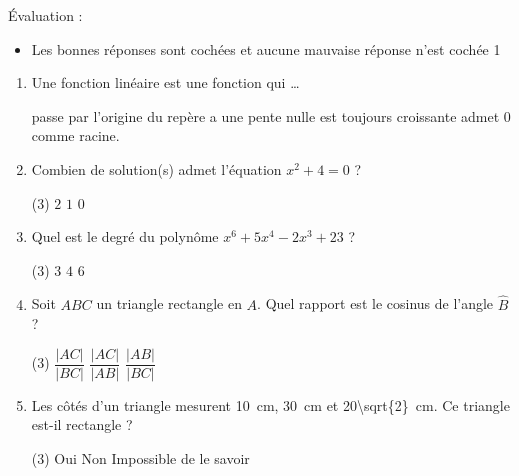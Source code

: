 %
%
    Évaluation :
    \begin{itemize}
        \item Les bonnes réponses sont cochées et aucune mauvaise réponse n'est cochée \hfill 1
    \end{itemize}
    \begin{enumerate}
        \item Une fonction linéaire est une fonction qui \dots
              \begin{QCM}
                  \choice[\faCheckSquare] passe par l'origine du repère
                  \choice a une pente nulle
                  \choice est toujours croissante
                  \choice[\faCheckSquare] admet $0$ comme racine.
              \end{QCM}
        \item Combien de solution(s) admet l'équation $x^2+4=0$ ?
              \begin{QCM}(3)
                  \choice $2$
                  \choice $1$
                  \choice[\faCheckSquare] $0$
              \end{QCM}
        \item Quel est le degré du polynôme $x^6 + 5x^4 -2x^3 +23$ ?
              \begin{QCM}(3)
                  \choice $3$
                  \choice $4$
                  \choice[\faCheckSquare] $6$
              \end{QCM}
        \item Soit $ABC$ un triangle rectangle en $A$. Quel rapport est le cosinus de l'angle $\widehat{B}$ ?
              \begin{QCM}(3)
                  \choice $\dfrac{|AC|}{|BC|}$
                  \choice $\dfrac{|AC|}{|AB|}$
                  \choice[\faCheckSquare] $\dfrac{|AB|}{|BC|}$
              \end{QCM}
        \item Les côtés d'un triangle mesurent \SI{10}{cm}, \SI{30}{cm} et \SI{20\sqrt{2}}{cm}. Ce triangle est-il rectangle ?
              \begin{QCM}(3)
                  \choice[\faCheckSquare] Oui
                  \choice Non
                  \choice Impossible de le savoir
              \end{QCM}
    \end{enumerate}
